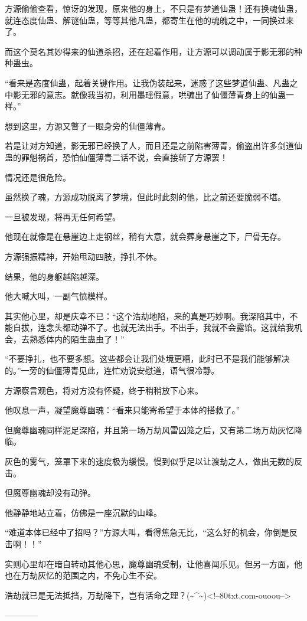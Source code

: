 \begin{this_body}
方源偷偷查看，惊讶的发现，原来他的身上，不只是有梦道仙蛊！还有换魂仙蛊，就连态度仙蛊、解谜仙蛊，等等其他凡蛊，都寄生在他的魂魄之中，一同换过来了。

而这个莫名其妙得来的仙道杀招，还在起着作用，让方源可以调动属于影无邪的种种蛊虫。

“看来是态度仙蛊，起着关键作用。让我伪装起来，迷惑了这些梦道仙蛊、凡蛊之中影无邪的意志。就像我当初，利用墨瑶假意，哄骗出了仙僵薄青身上的仙蛊一样。”

想到这里，方源又瞥了一眼身旁的仙僵薄青。

若是让对方知道，影无邪已经换了人，而且还是之前陷害薄青，偷盗出许多剑道仙蛊的罪魁祸首，恐怕仙僵薄青二话不说，会直接斩了方源罢！

情况还是很危险。

虽然换了魂，方源成功脱离了梦境，但此时此刻的他，比之前还要脆弱不堪。

一旦被发现，将再无任何希望。

他现在就像是在悬崖边上走钢丝，稍有大意，就会葬身悬崖之下，尸骨无存。

方源强振精神，开始甩动四肢，挣扎不休。

结果，他的身躯越陷越深。

他大喊大叫，一副气愤模样。

其实他心里，却是庆幸不已：“这个浩劫地陷，来的真是巧妙啊。我深陷其中，不能自拔，连念头都动弹不了。也就无法出手。不出手，我就不会露馅。这就给我机会，去熟悉体内的陌生蛊虫了！”

“不要挣扎，也不要多想。这些都会让我们处境更糟，此时已不是我们能够解决的。”一旁的仙僵薄青见此，连忙劝说安慰道，语气很冷静。

方源察言观色，将对方没有怀疑，终于稍稍放下心来。

他叹息一声，凝望魔尊幽魂：“看来只能寄希望于本体的搭救了。”

但魔尊幽魂同样泥足深陷，并且第一场万劫风雷囚笼之后，又有第二场万劫灰忆降临。

灰色的雾气，笼罩下来的速度极为缓慢。慢到似乎足以让渡劫之人，做出无数的反击。

但魔尊幽魂却没有动弹。

他静静地站立着，仿佛是一座沉默的山峰。

“难道本体已经中了招吗？”方源大叫，看得焦急无比，“这么好的机会，你倒是反击啊！！”

实则心里却在暗自转动其他心思，魔尊幽魂受制，让他喜闻乐见。但另一方面，他也在万劫灰忆的范围之内，不免心生不安。

浩劫就已是无法抵挡，万劫降下，岂有活命之理？(\~{}\^{}\~{})<!--80txt.com-ouoou-->

------------

\end{this_body}

